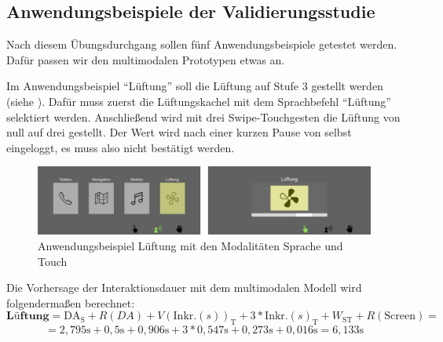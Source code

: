 \subsection[Anwendungsbeispiele]{Anwendungsbeispiele der Validierungsstudie}
Nach diesem Übungsdurchgang sollen fünf Anwendungsbeispiele getestet werden. 
Dafür passen wir den multimodalen Prototypen etwas an.
 
Im Anwendungsbeispiel "`Lüftung"' soll die Lüftung auf Stufe 3 gestellt werden (siehe ). Dafür muss zuerst die Lüftungskachel mit dem Sprachbefehl "`Lüftung"' selektiert werden. 
Anschließend wird mit drei Swipe-Touchgesten die Lüftung von null auf drei gestellt. 
Der Wert wird nach einer kurzen Pause von selbst eingeloggt, es muss also nicht bestätigt werden.  
\begin{figure}
	\centering
		\includegraphics[width=1\textwidth]{img/UseCases_Eval_Luft.jpg}
	\caption[]{Anwendungsbeispiel Lüftung mit den Modalitäten Sprache und Touch}
	\label{fig:UseCasesEvalLuft}
\end{figure}
Die Vorhersage der Interaktionsdauer mit dem multimodalen Modell wird folgendermaßen berechnet:
\[
\textbf{Lüftung} = \text{DA}_\text{S} + R(DA) + V(\text{Inkr.} (s))_\text{T} + 3*\text{Inkr.} (s)_\text{T}  + W_\text{ST} + R(\text{Screen}) =
\]
\[
= 2,795\text{s} + 0,5\text{s} + 0,906\text{s} + 3*0,547\text{s} +  0,273\text{s} + 0,016\text{s} = 6,133\text{s}
\]

